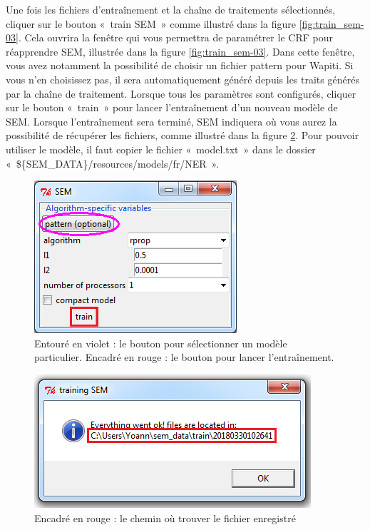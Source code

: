 \documentclass[manual-fr.tex]{subfiles}
\begin{document}
Une fois les fichiers d'entraînement et la chaîne de traitements sélectionnés, cliquer sur le bouton «~train SEM~» comme illustré dans la figure \ref{fig:train_sem-03}. Cela ouvrira la fenêtre qui vous permettra de paramétrer le CRF pour réapprendre SEM, illustrée dans la figure \ref{fig:train_sem-03}. Dans cette fenêtre, vous avez notamment la possibilité de choisir un fichier pattern pour Wapiti. Si vous n'en choisissez pas, il sera automatiquement généré depuis les traits générés par la chaîne de traitement. Lorsque tous les paramètres sont configurés, cliquer sur le bouton «~train~» pour lancer l'entraînement d'un nouveau modèle de SEM. Lorsque l'entraînement sera terminé, SEM indiquera où vous aurez la possibilité de récupérer les fichiers, comme illustré dans la figure \ref{fig:train_sem-06}. Pour pouvoir utiliser le modèle, il faut copier le fichier «~model.txt~» dans le dossier «~\$\{SEM\_DATA\}/resources/models/fr/NER~».

\begin{figure}[ht!]
    \begin{center}
    \includegraphics[scale=0.75]{fr/images/train_sem-05.png}
    \end{center}
    \caption{Entouré en violet : le bouton pour sélectionner un modèle particulier. Encadré en rouge : le bouton pour lancer l'entraînement.}
    \label{fig:train_sem-05}
\end{figure}

\begin{figure}[ht!]
    \begin{center}
    \includegraphics[scale=0.75]{fr/images/train_sem-06.png}
    \end{center}
    \caption{Encadré en rouge : le chemin où trouver le fichier enregistré}
    \label{fig:train_sem-06}
\end{figure}
\end{document}
